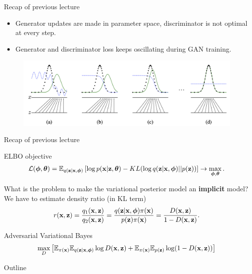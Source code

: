 \begin{frame}{Recap of previous lecture}
	\begin{itemize}
		\item Generator updates are made in parameter space, discriminator is not optimal at every step.
		\item Generator and discriminator loss keeps oscillating during GAN training.
	\end{itemize}
	\vspace{-0.3cm}
	\begin{figure}
		\centering
		\includegraphics[width=1.0\linewidth]{figs/gan_1}
	\end{figure}
\end{frame}
\begin{frame}{Recap of previous lecture}
\vspace{-0.3cm}
	\begin{block}{ELBO objective}
		\vspace{-0.5cm}
		\[
			 \mathcal{L} (\boldsymbol{\phi}, \boldsymbol{\theta})  = \mathbb{E}_{q(\mathbf{z} | \mathbf{x}, \boldsymbol{\phi})} \left[\log p(\mathbf{x} | \mathbf{z}, \boldsymbol{\theta}) - KL(\log q(\mathbf{z}| \mathbf{x}, \boldsymbol{\phi}) || p(\mathbf{z})) \right] \rightarrow \max_{\boldsymbol{\phi}, \boldsymbol{\theta}}.
		\]	
		\vspace{-0.5cm}
	\end{block}
	What is the problem to make the variational posterior model an \textbf{implicit} model? \\
	 We have to estimate density ratio (in KL term)
	\[
		r(\mathbf{x}, \mathbf{z}) = \frac{q_1(\mathbf{x}, \mathbf{z})}{q_2(\mathbf{x}, \mathbf{z})} = \frac{q(\mathbf{z}| \mathbf{x}, \boldsymbol{\phi}) \pi (\mathbf{x})}{p(\mathbf{z}) \pi(\mathbf{x})} = \frac{D(\mathbf{x}, \mathbf{z})}{1 - D(\mathbf{x}, \mathbf{z})}.
	\] 
	\begin{block}{Adversarial Variational Bayes}
		\vspace{-0.6cm}
		\[
			\max_D \left[ \mathbb{E}_{\pi(\mathbf{x})} \mathbb{E}_{q(\mathbf{z} | \mathbf{x}, \boldsymbol{\phi})} \log D(\mathbf{x}, \mathbf{z}) + \mathbb{E}_{\pi(\mathbf{x})} \mathbb{E}_{p(\mathbf{z})} \log (1 - D(\mathbf{x}, \mathbf{z})) \right]
		\]
	\end{block}
\end{frame}
\begin{frame}{Outline}
	\tableofcontents
\end{frame}
